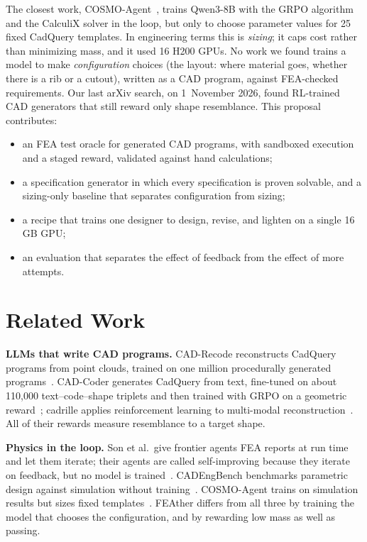 \documentclass[conference]{IEEEtran}
\begin{document}
The closest work, COSMO-Agent~\cite{deng2026cosmo}, trains Qwen3-8B with the GRPO algorithm and the
CalculiX solver in the loop, but only to choose parameter values for 25 fixed CadQuery templates. In
engineering terms this is \emph{sizing}; it caps cost rather than minimizing mass, and it used 16 H200
GPUs. No work we found trains a model to make \emph{configuration} choices (the layout: where material
goes, whether there is a rib or a cutout), written as a CAD program, against FEA-checked requirements.
Our last arXiv search, on 1~November 2026, found RL-trained CAD generators that still reward only shape
resemblance. This proposal contributes:
\begin{itemize}
\item an FEA test oracle for generated CAD programs, with sandboxed execution and a staged reward,
validated against hand calculations;
\item a specification generator in which every specification is proven solvable, and a sizing-only
baseline that separates configuration from sizing;
\item a recipe that trains one designer to design, revise, and lighten on a single 16\,GB GPU;
\item an evaluation that separates the effect of feedback from the effect of more attempts.
\end{itemize}

\section{Related Work}

\textbf{LLMs that write CAD programs.} CAD-Recode reconstructs CadQuery programs from point clouds,
trained on one million procedurally generated programs~\cite{rukhovich2024cadrecode}. CAD-Coder
generates CadQuery from text, fine-tuned on about 110{,}000 text--code--shape triplets and then trained
with GRPO on a geometric reward~\cite{guan2025cadcoder}; cadrille applies reinforcement learning to
multi-modal reconstruction~\cite{kolodiazhnyi2026cadrille}. All of their rewards measure resemblance to
a target shape.

\textbf{Physics in the loop.} Son et al.\ give frontier agents FEA reports at run time and let them
iterate; their agents are called self-improving because they iterate on feedback, but no model is
trained~\cite{son2026selfimproving}. CADEngBench benchmarks parametric design against simulation
without training~\cite{singh2026cadengbench}. COSMO-Agent trains on simulation results but sizes fixed
templates~\cite{deng2026cosmo}. FEAther differs from all three by training the model that chooses the
configuration, and by rewarding low mass as well as passing.
\end{document}
